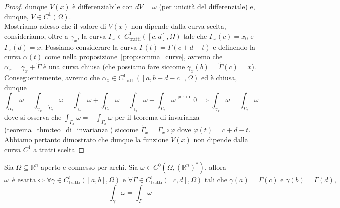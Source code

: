\begin{proof}
dunque $V(x)$ è differenziabile con $dV = \omega$ (per unicità del differenziale) e, dunque, $V \in C^1(\Omega)$. \\
Mostriamo adesso che il valore di $V(x)$ non dipende dalla curva scelta, consideriamo, oltre a $\gamma_x$, la curva $\Gamma_x \in C^1_\text{tratti}([c, d], \Omega)$ tale che $\Gamma_x(c) = x_0$ e $\Gamma_x(d) = x$. Possiamo considerare la curva $\tilde{\Gamma}(t) = \Gamma(c + d - t)$ e definendo la curva $\alpha(t)$ come nella proposizione~\ref{prop:somma_curve}, avremo che $\alpha_x = \gamma_x + \tilde{\Gamma}$ è una curva chiusa (che possiamo fare
siccome $\gamma_x(b) = \tilde{\Gamma}(c) = x$). \\
Conseguentemente, avremo che $\alpha_x \in C^1_\text{tratti}([a, b+d-c], \Omega)$ ed è chiusa, dunque
$$
\int_{\alpha_x} \omega = \int_{\gamma_x + \tilde{\Gamma}_x} \omega = \int_{\gamma_x} \omega + \int_{\tilde{\Gamma}_x} \omega = \int_{\gamma_x} \omega - \int_{\Gamma_x} \omega \stackrel{\text{per ip.}}{=} 0 \implies \int_{\gamma_x} \omega= \int_{\Gamma_x} \omega
$$
dove si osserva che $\int_{\tilde{\Gamma}_x} \omega = - \int_{\Gamma_x} \omega$ per il teorema di invarianza (teorema~\ref{thm:teo_di_invarianza}) siccome $\tilde{\Gamma}_x = \Gamma_x \circ \varphi$ dove $\varphi(t) = c + d - t$. Abbiamo pertanto dimostrato che dunque la funzione $V(x)$ non dipende dalla curva $C^1$ a tratti scelta
\end{proof}
\begin{theorem}[teorema CF2]
	Sia $\Omega \subseteq \mathbb{R}^n$ aperto e connesso per archi. Sia $\omega \in C^0(\Omega, (\mathbb{R}^n)^*)$, allora $\omega \, \text{ è esatta} \iff \forall \gamma \in C^1_\text{tratti}([a,b], \Omega) \text{ e } \forall \Gamma \in C^1_\text{tratti}([c,d], \Omega) \text{ tali che } \gamma(a) = \Gamma(c) \text{ e } \gamma(b) = \Gamma(d), $
	$$ 
	\int_\gamma \omega = \int_\Gamma \omega
	$$
\end{theorem}
